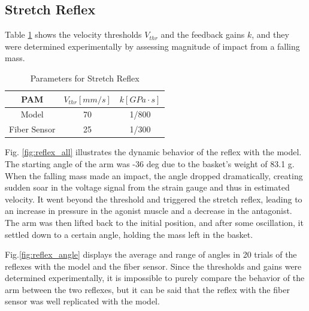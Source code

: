 \subsection{Stretch Reflex}
Table \ref{tab:reflex_para} shows the velocity thresholds $V_{thr}$ and the feedback gains $k$, and they were determined experimentally by assessing magnitude of impact from a falling mass. 
\begin{table}[h]
    \centering
    \caption{Parameters for Stretch Reflex} 
    \begin{tabular}{c|cc}
        \hline
        PAM &$V_{thr} [\si{mm/s}]$&$ k [\si{GPa\cdot s}]$\\
        \hline \hline
        Model & 70 & 1/800\\
        Fiber Sensor & 25 & 1/300\\
        \hline
    \end{tabular}
\label{tab:reflex_para}
\end{table}
Fig. \ref{fig:reflex_all} illustrates the dynamic behavior of the reflex with the model. The starting angle of the arm was -36 deg due to the basket's weight of 83.1 g. When the falling mass made an impact, the angle dropped dramatically, creating sudden soar in the voltage signal from the strain gauge and thus in estimated velocity. It went beyond the threshold and triggered the stretch reflex, leading to an increase in pressure in the agonist muscle and a decrease in the antagonist. The arm was then lifted back to the initial position, and after some oscillation, it settled down to a certain angle, holding the mass left in the basket.

Fig.\ref{fig:reflex_angle} displays the average and range of angles in 20 trials of the reflexes with the model and the fiber sensor. Since the thresholds and gains were determined experimentally, it is impossible to purely compare the behavior of the arm between the two reflexes, but it can be said that the reflex with the fiber sensor was well replicated with the model.



